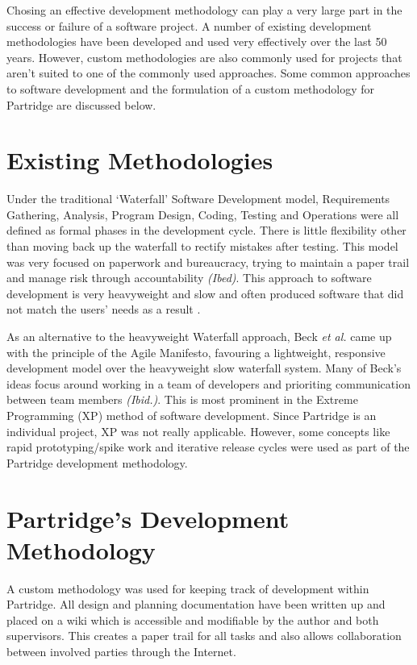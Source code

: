 Chosing an effective development methodology can play a very large part in the
success or failure of a software project. A number of existing development
methodologies have been developed and used very effectively over the last 50
years. However, custom methodologies are also commonly used for projects that
aren't suited to one of the commonly used approaches. Some common approaches to
software development and the formulation of a custom methodology for Partridge
are discussed below.

\section{Existing Methodologies} 

Under the traditional `Waterfall' Software Development model, Requirements
Gathering, Analysis, Program Design, Coding, Testing and Operations were all
defined as formal phases in the development cycle. There is little flexibility
other than moving back up the waterfall to rectify mistakes after
testing\cite{Royce:1987:MDL:41765.41801}. This model was very focused on
paperwork and bureaucracy, trying to maintain a paper trail and manage risk
through accountability \emph{(Ibed)}. This approach to software development is
very heavyweight and slow and often produced software that did not match the
users' needs as a result \cite{Boehm1988}.

As an alternative to the heavyweight Waterfall approach, Beck \emph{et al.}
came up with the principle of the Agile Manifesto, favouring a lightweight,
responsive development model over the heavyweight slow waterfall
system\cite{beck2001agile}. Many of Beck's ideas focus around working in a team
of developers and prioriting communication between team members \emph{(Ibid.)}.
This is most prominent in the Extreme Programming (XP) method of software
development. Since Partridge is an individual project, XP was not really
applicable. However, some concepts like rapid prototyping/spike work and
iterative release cycles were used as part of the Partridge development
methodology.

\section{ Partridge's Development Methodology}

A custom methodology was used for keeping track of development within
Partridge.  All design and planning documentation have been written up and
placed on a wiki which is accessible and modifiable by the author and both
supervisors. This creates a paper trail for all tasks and also allows
collaboration between involved parties through the Internet.

